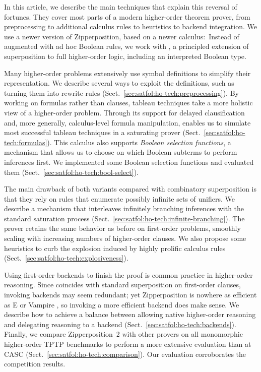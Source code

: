 \documentclass[smallcondensed,draft]{svjour3}     %
\begin{document}
In this article, we describe the main techniques that explain this reversal
of fortunes. They cover most parts of a modern higher-order theorem prover, from
preprocessing to additional calculus rules to heuristics to backend
integration. We use a newer version of Zipperposition, based on a newer
calculus:\ Instead of \lsup{} augmented with ad hoc Boolean rules,
we work with \emph{\osup} \cite{bbtv-21-full-ho-sup}, a principled extension of superposition to full
higher-order logic, including an interpreted Boolean type.

Many higher-order problems extensively use symbol definitions to simplify
their representation. We describe several ways to exploit the definitions,
such as turning them into rewrite rules (Sect.~\ref{sec:satfol:ho-tech:preprocessing}).
%
By working on formulas rather than clauses, tableau techniques take a more
holistic view of a higher-order problem.
Through its support for delayed clausification and, more generally,
calculus-level formula manipulation, \osup{} enables us to
simulate most successful tableau techniques in a saturating prover
(Sect.~\ref{sec:satfol:ho-tech:formulas}). This calculus also supports \emph{Boolean selection
functions}, a mechanism that allows us to choose on which Boolean subterms
to perform inferences first.
We implemented some Boolean selection functions and
evaluated them (Sect.~\ref{sec:satfol:ho-tech:bool-select}).

The main drawback of both \lsup{} variants compared with combinatory
superposition is that they rely on rules that enumerate possibly infinite sets
of unifiers. We describe a mechanism that interleaves infinitely
branching inferences with the standard saturation process
(Sect.~\ref{sec:satfol:ho-tech:infinite-branching}). The prover
retains the same behavior as
before on first-order problems, smoothly scaling with
increasing numbers of higher-order clauses.
%
We also propose some heuristics to curb the explosion induced by highly
prolific calculus rules (Sect.~\ref{sec:satfol:ho-tech:explosiveness}).

Using first-order backends to finish the proof is common practice in
higher-order reasoning. Since \lsup{} coincides with standard
superposition on first-order clauses, invoking backends may
seem redundant; yet Zipperposition is nowhere as efficient as E
\cite{scv-19-e23} or Vampire \cite{lkav-13-vampire}, so invoking a more
efficient backend does make sense. We describe how to achieve a balance
between allowing native higher-order reasoning and
delegating reasoning to a backend (Sect.~\ref{sec:satfol:ho-tech:backends}).
%
Finally, we compare Zipperposition~2 with other provers on all monomorphic
higher-order TPTP benchmarks \cite{gs-17-tptp} to perform a more extensive
evaluation than at CASC (Sect.~\ref{sec:satfol:ho-tech:comparison}). Our evaluation
corroborates the competition results.
\end{document}
